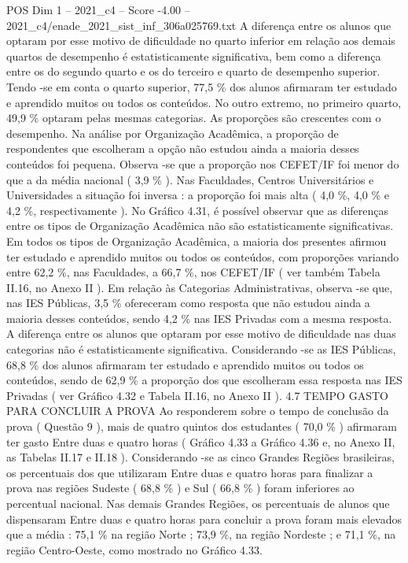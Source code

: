 \begin{textsample}{POS Dim 1 – 2021\_c4 – Score -4.00 – 2021\_c4/enade\_2021\_sist\_inf\_306a025769.txt}
A diferença entre os alunos que optaram por esse motivo de dificuldade no quarto inferior em relação aos demais quartos de desempenho é estatisticamente significativa, bem como a diferença entre os do segundo quarto e os do terceiro e quarto de desempenho superior.
Tendo -se em conta o quarto superior, 77,5 \% dos alunos afirmaram ter estudado e aprendido muitos ou todos os conteúdos.
No outro extremo, no primeiro quarto, 49,9 \% optaram pelas mesmas categorias.
As proporções são crescentes com o desempenho.
Na análise por Organização Acadêmica, a proporção de respondentes que escolheram a opção não estudou ainda a maioria desses conteúdos foi pequena.
Observa -se que a proporção nos CEFET/IF foi menor do que a da média nacional ( 3,9 \% ).
Nas Faculdades, Centros Universitários e Universidades a situação foi inversa : a proporção foi mais alta ( 4,0 \%, 4,0 \% e 4,2 \%, respectivamente ).
No Gráfico 4.31, é possível observar que as diferenças entre os tipos de Organização Acadêmica não são estatisticamente significativas.
Em todos os tipos de Organização Acadêmica, a maioria dos presentes afirmou ter estudado e aprendido muitos ou todos os conteúdos, com proporções variando entre 62,2 \%, nas Faculdades, a 66,7 \%, nos CEFET/IF ( ver também Tabela II.16, no Anexo II ).
Em relação às Categorias Administrativas, observa -se que, nas IES Públicas, 3,5 \% ofereceram como resposta que não estudou ainda a maioria desses conteúdos, sendo 4,2 \% nas IES Privadas com a mesma resposta.
A diferença entre os alunos que optaram por esse motivo de dificuldade nas duas categorias não é estatisticamente significativa.
Considerando -se as IES Públicas, 68,8 \% dos alunos afirmaram ter estudado e aprendido muitos ou todos os conteúdos, sendo de 62,9 \% a proporção dos que escolheram essa resposta nas IES Privadas ( ver Gráfico 4.32 e Tabela II.16, no Anexo II ). 4.7 TEMPO GASTO PARA CONCLUIR A PROVA Ao responderem sobre o tempo de conclusão da prova ( Questão 9 ), mais de quatro quintos dos estudantes ( 70,0 \% ) afirmaram ter gasto Entre duas e quatro horas ( Gráfico 4.33 a Gráfico 4.36 e, no Anexo II, as Tabelas II.17 e II.18 ).
Considerando -se as cinco Grandes Regiões brasileiras, os percentuais dos que utilizaram Entre duas e quatro horas para finalizar a prova nas regiões Sudeste ( 68,8 \% ) e Sul ( 66,8 \% ) foram inferiores ao percentual nacional.
Nas demais Grandes Regiões, os percentuais de alunos que dispensaram Entre duas e quatro horas para concluir a prova foram mais elevados que a média : 75,1 \% na região Norte ; 73,9 \%, na região Nordeste ; e 71,1 \%, na região Centro-Oeste, como mostrado no Gráfico 4.33.

\end{textsample}

